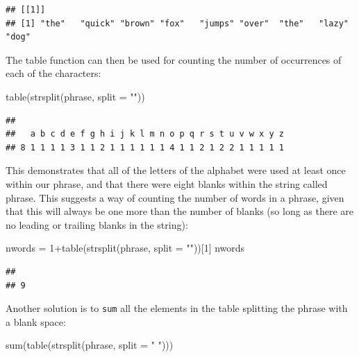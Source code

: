 \documentclass[
]{book}
\newenvironment{Shaded}{\begin{snugshade}}{\end{snugshade}}
\newcommand{\AttributeTok}[1]{\textcolor[rgb]{0.77,0.63,0.00}{#1}}
\newcommand{\DecValTok}[1]{\textcolor[rgb]{0.00,0.00,0.81}{#1}}
\newcommand{\FunctionTok}[1]{\textcolor[rgb]{0.00,0.00,0.00}{#1}}
\newcommand{\NormalTok}[1]{#1}
\newcommand{\OtherTok}[1]{\textcolor[rgb]{0.56,0.35,0.01}{#1}}
\newcommand{\SpecialCharTok}[1]{\textcolor[rgb]{0.00,0.00,0.00}{#1}}
\newcommand{\StringTok}[1]{\textcolor[rgb]{0.31,0.60,0.02}{#1}}
\theoremstyle{definition}
\theoremstyle{definition}
\theoremstyle{definition}
\theoremstyle{definition}
\theoremstyle{remark}
\begin{document}
\begin{verbatim}
## [[1]]
## [1] "the"   "quick" "brown" "fox"   "jumps" "over"  "the"   "lazy"  "dog"
\end{verbatim}

The table function can then be used for counting the number of occurrences of each of the characters:

\begin{Shaded}
\begin{Highlighting}[]
\FunctionTok{table}\NormalTok{(}\FunctionTok{strsplit}\NormalTok{(phrase, }\AttributeTok{split =} \StringTok{""}\NormalTok{))}
\end{Highlighting}
\end{Shaded}

\begin{verbatim}
## 
##   a b c d e f g h i j k l m n o p q r s t u v w x y z 
## 8 1 1 1 1 3 1 1 2 1 1 1 1 1 1 4 1 1 2 1 2 2 1 1 1 1 1
\end{verbatim}

This demonstrates that all of the letters of the alphabet were used at least once within our phrase, and that there were eight blanks within the string called phrase. This suggests a way of counting the number of words in a phrase, given that this will always be one more than the number of blanks (so long as there are no leading or trailing blanks in the string):

\begin{Shaded}
\begin{Highlighting}[]
\NormalTok{nwords }\OtherTok{=} \DecValTok{1}\SpecialCharTok{+}\FunctionTok{table}\NormalTok{(}\FunctionTok{strsplit}\NormalTok{(phrase, }\AttributeTok{split =} \StringTok{""}\NormalTok{))[}\DecValTok{1}\NormalTok{]}
\NormalTok{nwords}
\end{Highlighting}
\end{Shaded}

\begin{verbatim}
##   
## 9
\end{verbatim}

Another solution is to \texttt{sum} all the elements in the table splitting the phrase with a blank space:

\begin{Shaded}
\begin{Highlighting}[]
\FunctionTok{sum}\NormalTok{(}\FunctionTok{table}\NormalTok{(}\FunctionTok{strsplit}\NormalTok{(phrase, }\AttributeTok{split =} \StringTok{" "}\NormalTok{)))}
\end{Highlighting}
\end{Shaded}
\end{document}

